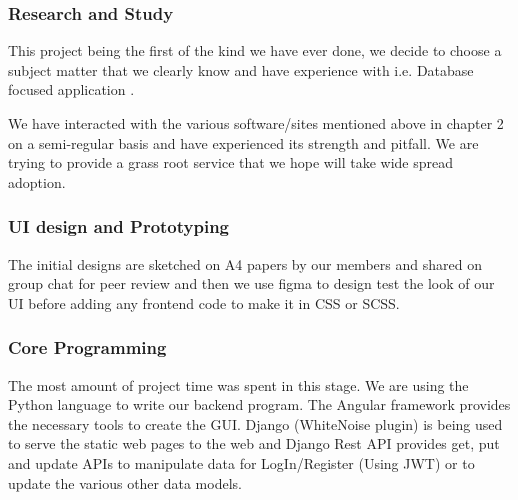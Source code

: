 \documentclass[12pt]{article}
\begin{document}
\subsubsection{Research and Study}
This project being the first of the kind we have ever done, we decide to choose a subject matter that we clearly know and have experience with i.e. Database focused application . 

We have interacted with the various software/sites mentioned above in chapter 2 on a semi-regular basis and have experienced its strength 
and pitfall. We are trying to provide a grass root service that we hope will take wide spread adoption.

\subsubsection{UI design and Prototyping}
The initial designs are sketched on A4 papers by our members and shared on group chat for peer review and then we use figma to design test the look of our UI before adding any frontend code to make it in CSS or SCSS.

\subsubsection{Core Programming}
The most amount of project time was spent in this stage. We are using the Python language to write our backend program. The Angular framework provides the necessary tools to create 
the GUI. Django (WhiteNoise plugin) is being used to serve the static web pages to the web and Django Rest API provides get, put and update APIs to manipulate data for LogIn/Register 
(Using JWT) or to update the various other data models.
\end{document}
